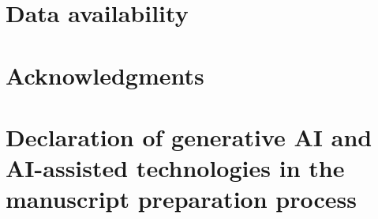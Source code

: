 \documentclass[preprint,12pt]{elsarticle}
\begin{document}
\section*{Data availability}


\section*{Acknowledgments}



\section*{Declaration of generative AI and AI-assisted technologies in the manuscript preparation process}




\end{document}
